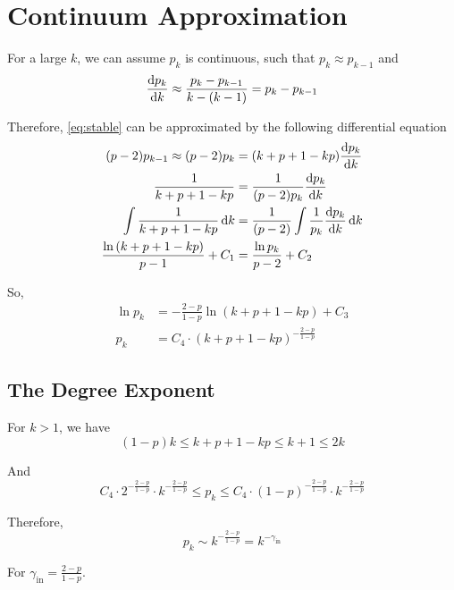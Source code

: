 \section{Continuum Approximation}

For a large $k$, we can assume $p_k$ is continuous, such that $p_k \approx p_{k-1}$ and \[
    \dv{p_k}{k} \approx \frac{p_k - p_{k-1}}{k - (k-1)} = p_k - p_{k-1}
\]

Therefore, \cref{eq:stable} can be approximated by the following differential equation
\begin{align*}
    (p - 2) p_{k-1} \approx (p - 2) p_k &= (k + p + 1 - k p) \dv{p_k}{k} \\
        \frac{1}{k + p + 1 - k p} &= \frac{1}{(p - 2) p_k} \dv{p_k}{k} \\
        \int \frac{1}{k + p + 1 - k p} \dd{k} &= \frac{1}{(p - 2)} \int \frac{1}{p_k} \dv{p_k}{k} \dd{k} \\
        \frac{\ln\left(k + p + 1 - k p\right)}{p - 1} + C_1 &= \frac{\ln p_k}{p - 2} + C_2
\end{align*}

So,
\begin{align*}
    \ln p_k &= - \frac{2 - p}{1 - p} \ln\left(k + p + 1 - k p\right) + C_3 \\
    p_k &= C_4 \cdot \left(k + p + 1 - k p\right)^{-\frac{2 - p}{1 - p}}
\end{align*}

\subsection{The Degree Exponent}

    For $k > 1$, we have \[
        (1 - p) k \leq k + p + 1 - k p \leq k + 1 \leq 2 k
    \]

    And \[
        C_4 \cdot 2^{-\frac{2 - p}{1 - p}} \cdot k^{-\frac{2 - p}{1 - p}} \leq p_k \leq C_4 \cdot (1 - p)^{-\frac{2 - p}{1 - p}} \cdot k^{-\frac{2 - p}{1 - p}}
    \]

    Therefore,
    \[
        p_k \sim k^{-\frac{2 - p}{1 - p}} = k^{-\gamma_\text{in}}
    \]

    For $\gamma_\text{in} = \frac{2 - p}{1 - p}$.
